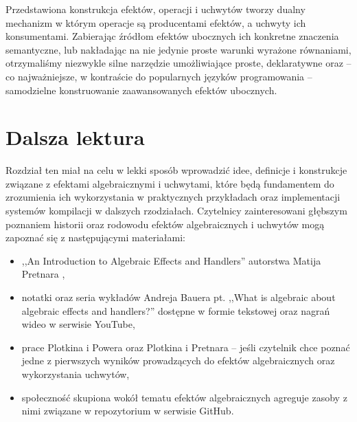 Przedstawiona konstrukcja efektów, operacji i uchwytów tworzy dualny mechanizm w którym operacje są producentami efektów, a uchwyty ich konsumentami. Zabierając źródłom efektów ubocznych ich konkretne znaczenia semantyczne, lub nakładając na nie jedynie proste warunki wyrażone równaniami, otrzymaliśmy niezwykle silne narzędzie umożliwiające proste, deklaratywne oraz -- co najważniejsze, w kontraście do popularnych języków programowania -- samodzielne konstruowanie zaawansowanych efektów ubocznych.

\section{Dalsza lektura}

Rozdział ten miał na celu w lekki sposób wprowadzić idee, definicje i konstrukcje związane z efektami algebraicznymi i uchwytami, które będą fundamentem do zrozumienia ich wykorzystania w praktycznych przykładach oraz implementacji systemów kompilacji w dalszych rzodziałach. Czytelnicy zainteresowani głębszym poznaniem historii oraz rodowodu efektów algebraicznych i uchwytów mogą zapoznać się z następującymi materiałami:

\begin{itemize}
\item ,,An Introduction to Algebraic Effects and Handlers'' autorstwa Matija Pretnara \cite{pretnar2015introduction},
\item notatki oraz seria wykładów Andreja Bauera pt. ,,What is algebraic about algebraic effects and handlers?'' \cite{bauer2018algebraic} dostępne w formie tekstowej oraz nagrań wideo w serwisie YouTube,
\item prace Plotkina i Powera \cite{plotkin2001semantics, plotkin2002computational} oraz Plotkina i Pretnara \cite{plotkin2013handling} -- jeśli czytelnik chce poznać jedne z pierwszych wyników prowadzących do efektów algebraicznych oraz wykorzystania uchwytów,
\item społeczność skupiona wokół tematu efektów algebraicznych agreguje zasoby z nimi związane w repozytorium \cite{effectsbibliography} w serwisie GitHub.

\end{itemize}
